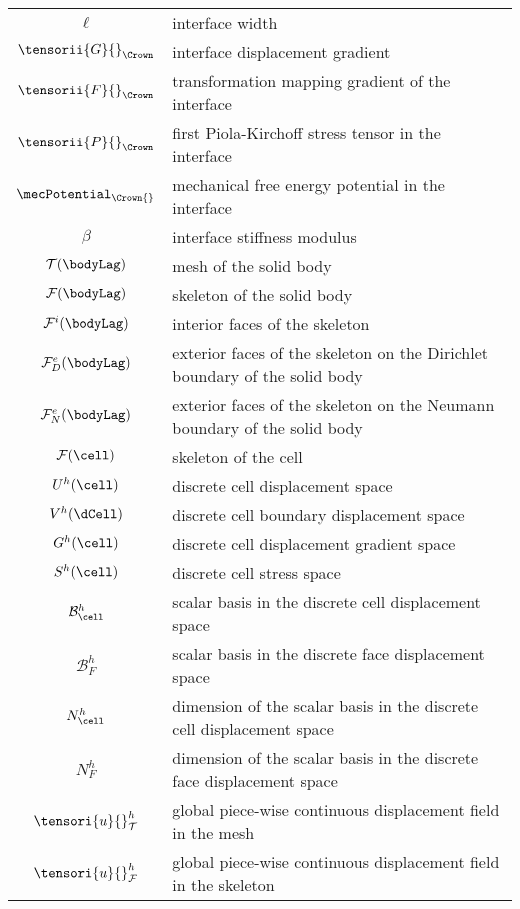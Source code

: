 \begin{longtable}{c l}
    $\ell$ & interface width
    \\
    $\tensorii{G}{}_{\Crown}$ & interface displacement gradient
    \\
    $\tensorii{F}{}_{\Crown}$ & transformation mapping gradient of the interface
    \\
    $\tensorii{P}{}_{\Crown}$ & first Piola-Kirchoff stress tensor in the interface
    \\
    $\mecPotential_{\Crown{}}$ & mechanical free energy potential in the interface
    \\
    $\beta$ & interface stiffness modulus
    \\
    $\mathcal{T}(\bodyLag)$ & mesh of the solid body
    \\
    $\mathcal{F}(\bodyLag)$ & skeleton of the solid body
    \\
    $\mathcal{F}^i(\bodyLag)$ & interior faces of the skeleton
    \\
    $\mathcal{F}^e_D(\bodyLag)$ & exterior faces of the skeleton on the Dirichlet boundary of the solid body
    \\
    $\mathcal{F}^e_N(\bodyLag)$ & exterior faces of the skeleton on the Neumann boundary of the solid body
    \\
    $\mathcal{F}(\cell)$ & skeleton of the cell
    \\
    $U^h(\cell)$ & discrete cell displacement space
    \\
    $V^h(\dCell)$ & discrete cell boundary displacement space
    \\
    $G^h(\cell)$ & discrete cell displacement gradient space
    \\
    $S^h(\cell)$ & discrete cell stress space
    \\
    $\mathcal{B}^h_{\cell}$ & scalar basis in the discrete cell displacement space 
    \\
    $\mathcal{B}^h_{F}$ & scalar basis in the discrete face displacement space 
    \\
    $N^h_{\cell}$ & dimension of the scalar basis in the discrete cell displacement space 
    \\
    $N^h_{F}$ & dimension of the scalar basis in the discrete face displacement space 
    \\
    $\tensori{u}{}_{\mathcal{T}}^h$ & global piece-wise continuous displacement field in the mesh
    \\
    $\tensori{u}{}_{\mathcal{F}}^h$ & global piece-wise continuous displacement field in the skeleton
    \\

\end{longtable}
